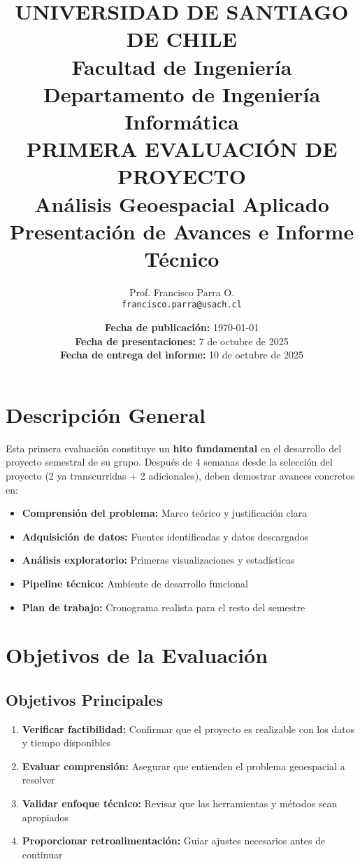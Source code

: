 \documentclass[11pt,letterpaper]{article}
\title{
    \vspace{-2cm}
    \Large{\textbf{UNIVERSIDAD DE SANTIAGO DE CHILE}} \\
    \large{Facultad de Ingeniería} \\
    \large{Departamento de Ingeniería Informática} \\
    \vspace{1cm}
    \LARGE{\textbf{PRIMERA EVALUACIÓN DE PROYECTO}} \\
    \Large{\textbf{Análisis Geoespacial Aplicado}} \\
    \vspace{0.5cm}
    \large{Presentación de Avances e Informe Técnico}
    \vspace{1cm}
}
\author{
    Prof. Francisco Parra O. \\
    \texttt{francisco.parra@usach.cl}
}
\date{
    \textbf{Fecha de publicación:} \today \\
    \textbf{Fecha de presentaciones:} 7 de octubre de 2025 \\
    \textbf{Fecha de entrega del informe:} 10 de octubre de 2025
}
\begin{document}
\maketitle

\section{Descripción General}

Esta primera evaluación constituye un \textbf{hito fundamental} en el desarrollo del proyecto semestral de su grupo. Después de 4 semanas desde la selección del proyecto (2 ya transcurridas + 2 adicionales), deben demostrar avances concretos en:

\begin{itemize}[leftmargin=*]
    \item \textbf{Comprensión del problema:} Marco teórico y justificación clara
    \item \textbf{Adquisición de datos:} Fuentes identificadas y datos descargados
    \item \textbf{Análisis exploratorio:} Primeras visualizaciones y estadísticas
    \item \textbf{Pipeline técnico:} Ambiente de desarrollo funcional
    \item \textbf{Plan de trabajo:} Cronograma realista para el resto del semestre
\end{itemize}

\section{Objetivos de la Evaluación}

\subsection{Objetivos Principales}
\begin{enumerate}
    \item \textbf{Verificar factibilidad:} Confirmar que el proyecto es realizable con los datos y tiempo disponibles
    \item \textbf{Evaluar comprensión:} Asegurar que entienden el problema geoespacial a resolver
    \item \textbf{Validar enfoque técnico:} Revisar que las herramientas y métodos sean apropiados
    \item \textbf{Proporcionar retroalimentación:} Guiar ajustes necesarios antes de continuar
\end{enumerate}
\end{document}
